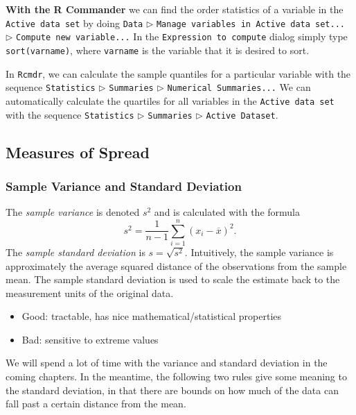 \documentclass[10pt,english]{scrbook}
\begin{document}
\textbf{With the R Commander}
we can find the order statistics of a variable in the \texttt{Active data set} by doing \texttt{Data} \(\triangleright\) \texttt{Manage variables in Active data set...} \(\triangleright\) \texttt{Compute new variable...} In the \texttt{Expression to compute} dialog simply type \texttt{sort(varname)}, where \texttt{varname} is the variable that it is desired to sort.

In \texttt{Rcmdr}, we can calculate the sample quantiles for a particular variable with the sequence \texttt{Statistics} \(\triangleright\) \texttt{Summaries} \(\triangleright\) \texttt{Numerical Summaries...} We can automatically calculate the quartiles for all variables in the \texttt{Active data set} with the sequence \texttt{Statistics} \(\triangleright\) \texttt{Summaries} \(\triangleright\) \texttt{Active Dataset}.
\subsection[Measures of Spread]{Measures of Spread}
\label{sec-1-3-4}

\subsubsection[Sample Variance and Standard Deviation]{Sample Variance and Standard Deviation}
\label{sec-1-3-4-1}

The \emph{sample variance} is denoted \(s^{2}\) and is calculated with the formula
\begin{equation}
s^{2}=\frac{1}{n-1}\sum_{i=1}^{n}(x_{i}-\overline{x})^{2}.
\end{equation}
The \emph{sample standard deviation} is \(s=\sqrt{s^{2}}\). Intuitively, the sample variance is approximately the average squared distance of the observations from the sample mean. The sample standard deviation is used to scale the estimate back to the measurement units of the original data.
\begin{itemize}
\item Good: tractable, has nice mathematical/statistical properties
\item Bad: sensitive to extreme values
\end{itemize}
We will spend a lot of time with the variance and standard deviation in the coming chapters. In the meantime, the following two rules give some meaning to the standard deviation, in that there are bounds on how much of the data can fall past a certain distance from the mean.
\end{document}
